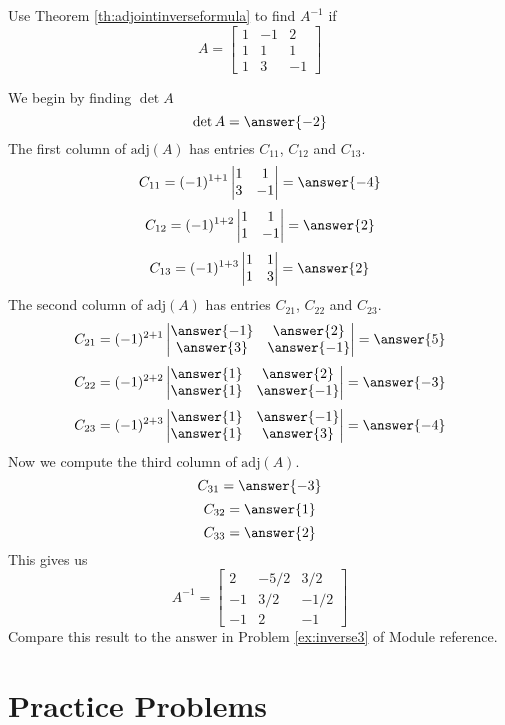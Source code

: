 \documentclass{ximera}
\begin{document}
\begin{example}
Use Theorem \ref{th:adjointinverseformula} to  find $A^{-1}$ if 
$$A=\begin{bmatrix}1&-1&2\\1&1&1\\1&3&-1\end{bmatrix}$$
\begin{explanation}
We begin by finding $\det{A}$
$$\det{A}=\answer{-2}$$
The first column of $\mbox{adj}(A)$ has entries $C_{11}$, $C_{12}$ and $C_{13}$.
$$C_{11}=(-1)^{1+1}\begin{vmatrix}1&1\\3&-1\end{vmatrix}=\answer{-4}$$
$$C_{12}=(-1)^{1+2}\begin{vmatrix}1&1\\1&-1\end{vmatrix}=\answer{2}$$
$$C_{13}=(-1)^{1+3}\begin{vmatrix}1&1\\1&3\end{vmatrix}=\answer{2}$$
The second column of $\mbox{adj}(A)$ has entries $C_{21}$, $C_{22}$ and $C_{23}$.
$$C_{21}=(-1)^{2+1}\begin{vmatrix}\answer{-1}&\answer{2}\\\answer{3}&\answer{-1}\end{vmatrix}=\answer{5}$$
$$C_{22}=(-1)^{2+2}\begin{vmatrix}\answer{1}&\answer{2}\\\answer{1}&\answer{-1}\end{vmatrix}=\answer{-3}$$
$$C_{23}=(-1)^{2+3}\begin{vmatrix}\answer{1}&\answer{-1}\\\answer{1}&\answer{3}\end{vmatrix}=\answer{-4}$$
Now we compute the third column of $\mbox{adj}(A)$.
$$C_{31}=\answer{-3}$$
$$C_{32}=\answer{1}$$
$$C_{33}=\answer{2}$$
This gives us
$$A^{-1}=\begin{bmatrix}2&-5/2&3/2\\-1&3/2&-1/2\\-1&2&-1\end{bmatrix}$$
Compare this result to the answer in Problem \ref{ex:inverse3} of Module {\color{red} reference}.

\end{explanation}
\end{example}

\section*{Practice Problems}
\end{document}
